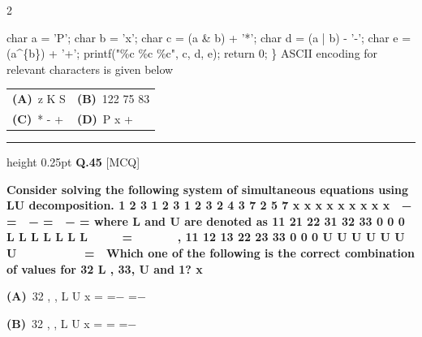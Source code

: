 \documentclass[a4paper,10pt,twoside]{article}
\begin{document}
\begin{multicols}{2}
{char a = 'P';
char b = 'x';
char c = (a \& b) + '*';
char d = (a | b) - '-';
char e = (a\^{}\{b\}) + '+';
printf("\%c \%c \%c\n", c, d, e);
return 0;
\}
ASCII encoding for relevant characters is given below \par}
\par\vspace{2pt}\noindent
\begin{tabular*}{\columnwidth}{@{\extracolsep{\fill}}p{}p{}@{}}
\textbf{(A)}~z K S & \textbf{(B)}~122 75 83 \\
\addlinespace[2pt]
\textbf{(C)}~* - + & \textbf{(D)}~P x +
\end{tabular*}
\par\vspace{6pt}\hrule height 0.25pt\vspace{6pt}
\noindent\textbf{Q.45} \hfill {\footnotesize\textsf{[MCQ]}}
\par\vspace{2pt}
{\bfseries Consider solving the following system of simultaneous equations using
LU decomposition.
1
2
3
1
2
3
1
2
3
2
4
3
7
2
5
7
x
x
x
x
x
x
x
x
x

−
=

−
=

−
=
where L and U are denoted as
11
21
22
31
32
33
0
0
0
L
L
L
L
L
L
L




=





,
11
12
13
22
23
33
0
0
0
U
U
U
U
U
U
U








=

Which one of the following is the correct combination of values for
32
L ,
33,
U
and
1?
x \par}
\par\vspace{2pt}\noindent
\textbf{(A)}~32    , \newline ,   \newline L \newline U \newline x \newline = \newline =− \newline =−\par\vspace{2pt}\noindent
\textbf{(B)}~32   , ,  \newline L \newline U \newline x \newline = \newline = \newline =−\par\vspace{2pt}\noindent

\end{multicols}
\end{document}
